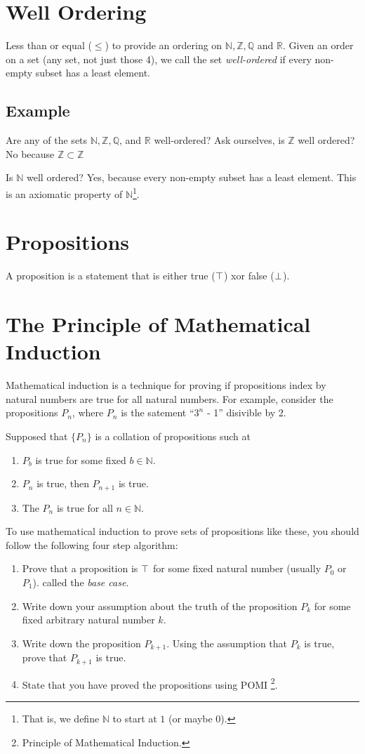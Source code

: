 \section{Well Ordering}
Less than or equal ($\leq$) to provide an ordering on $\mathbb{N},\mathbb{Z},\mathbb{Q}$ and $\mathbb{R}$.
Given an order on a set (any set, not just those 4), we call the set
\emph{well-ordered} if every non-empty subset has a least element.
\subsection{Example}
Are any of the sets $\mathbb{N}, \mathbb{Z}, \mathbb{Q}$, and $\mathbb{R}$
well-ordered?
Ask ourselves, is $\mathbb{Z}$ well ordered? No because $\mathbb{Z} \subset \mathbb{Z}$

Is $\mathbb{N}$ well ordered? Yes, because every non-empty subset has a least
element. This is an axiomatic property of $\mathbb{N}$\footnote{That is, we define
$\mathbb{N}$ to start at $1$ (or maybe $0$).}.

\section{Propositions}
A proposition is a statement that is either true ($\top$) xor false ($\bot$).

\section{The Principle of Mathematical Induction}
Mathematical induction is a technique for proving if propositions index by natural numbers
are true for all natural numbers. For example, consider the propositions $P_n$,
where $P_n$ is the satement ``$3^n$ - 1'' disivible by 2.

Supposed that $\{P_n\}$ is a collation of propositions such at
\begin{enumerate}
  \item $P_b$ is true for some fixed $b \in \mathbb{N}$.
  \item $P_n$ is true, then $P_{n+1}$ is true.
  \item The $P_n$ is true for all $n \in \mathbb{N}$.
\end{enumerate}
To use mathematical induction to prove sets of propositions like these, you
should follow the following four step algorithm:
\begin{enumerate}
  \item Prove that a proposition is $\top$ for some fixed natural number (usually
  $P_0$ or $P_1$). called the \emph{base case}.
  \item Write down your assumption about the truth of the proposition $P_k$ for
  some fixed arbitrary natural number $k$.
  \item Write down the proposition $P_{k+1}$. Using the assumption that $P_k$
  is true, prove that $P_{k+1}$ is true.
  \item State that you have proved the propositions using POMI
  \footnote{Principle of Mathematical Induction.}.
\end{enumerate}
